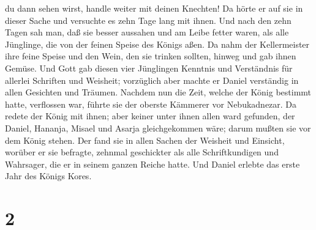 du dann sehen wirst, handle weiter mit deinen Knechten! 
Da hörte er auf sie in dieser Sache und versuchte es zehn Tage lang mit
ihnen.  Und nach den zehn Tagen sah man, daß sie besser
aussahen und am Leibe fetter waren, als alle Jünglinge, die von der
feinen Speise des Königs aßen.  Da nahm der Kellermeister
ihre feine Speise und den Wein, den sie trinken sollten, hinweg und gab
ihnen Gemüse.  Und Gott gab diesen vier Jünglingen
Kenntnis und Verständnis für allerlei Schriften und Weisheit; vorzüglich
aber machte er Daniel verständig in allen Gesichten und Träumen.
 Nachdem nun die Zeit, welche der König bestimmt hatte,
verflossen war, führte sie der oberste Kämmerer vor Nebukadnezar.
 Da redete der König mit ihnen; aber keiner unter ihnen
allen ward gefunden, der Daniel, Hananja, Misael und Asarja
gleichgekommen wäre; darum mußten sie vor dem König stehen.
 Der fand sie in allen Sachen der Weisheit und Einsicht,
worüber er sie befragte, zehnmal geschickter als alle Schriftkundigen
und Wahrsager, die er in seinem ganzen Reiche hatte.  Und
Daniel erlebte das erste Jahr des Königs Kores.

\hypertarget{section-1}{%
\section{2}\label{section-1}}

